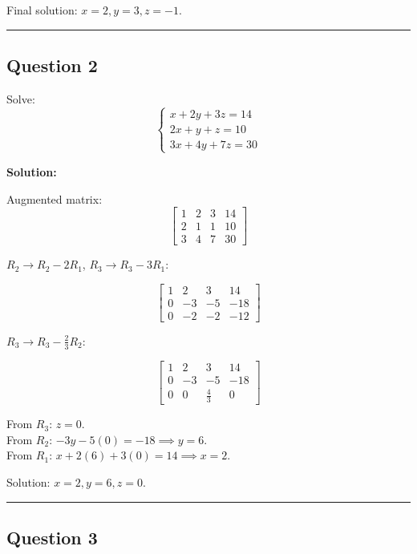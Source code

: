 \documentclass[
  letterpaper,
  DIV=11,
  numbers=noendperiod]{scrreprt}
\begin{document}
Final solution: \(\boxed{x=2, y=3, z=-1}\).

\begin{center}\rule{0.5\linewidth}{0.5pt}\end{center}

\subsection{Question 2}\label{question-2}

Solve: \[
\begin{cases}
x + 2y + 3z = 14 \\
2x + y + z = 10 \\
3x + 4y + 7z = 30
\end{cases}
\]

\textbf{Solution:}

Augmented matrix: \[
\begin{bmatrix}
1 & 2 & 3 & 14 \\
2 & 1 & 1 & 10 \\
3 & 4 & 7 & 30
\end{bmatrix}
\]

\(R_2 \rightarrow R_2 - 2R_1\), \(R_3 \rightarrow R_3 - 3R_1\):

\[
\begin{bmatrix}
1 & 2 & 3 & 14 \\
0 & -3 & -5 & -18 \\
0 & -2 & -2 & -12
\end{bmatrix}
\]

\(R_3 \rightarrow R_3 - \frac{2}{3}R_2\):

\[
\begin{bmatrix}
1 & 2 & 3 & 14 \\
0 & -3 & -5 & -18 \\
0 & 0 & \frac{4}{3} & 0
\end{bmatrix}
\]

From \(R_3\): \(z = 0\).\\
From \(R_2\): \(-3y - 5(0) = -18 \implies y = 6\).\\
From \(R_1\): \(x + 2(6) + 3(0) = 14 \implies x = 2\).

Solution: \(\boxed{x=2, y=6, z=0}\).

\begin{center}\rule{0.5\linewidth}{0.5pt}\end{center}

\subsection{Question 3}\label{question-3}
\end{document}
